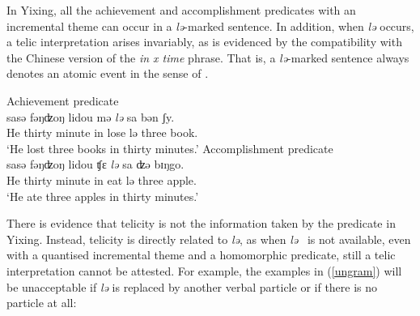 \documentclass[output=paper]{langsci/langscibook}
\begin{document}
In Yixing, all the achievement and accomplishment predicates with an
incremental theme can occur in a \emph{lə}-marked sentence. In addition, when
\emph{lə} occurs, a telic interpretation arises invariably, as is evidenced by
the compatibility with the Chinese version of the \emph{in x time} phrase. That
is, a \emph{lə}-marked sentence always denotes an atomic event in the sense of
\textcite{Rothstein2004}.

\begin{exe}
\ex Achievement predicate\label{achievement predicate}\\
    {sasə} {fəŋʣoŋ} lidou {mə} \emph{lə} sa bən ʃy. \\
    He thirty minute in lose {lə} three \Clf{} book. \\
    \glt \enquote*{He lost three books in thirty minutes.}
\ex Accomplishment predicate\label{accomplishment predicate}\\
    {sasə} {fəŋʣoŋ} lidou {ʧε} \emph{lə} sa {ʣə} bɪŋgo. \\
    He thirty minute in eat {lə} three \Clf{} apple. \\
    \glt \enquote*{He ate three apples in thirty minutes.}
\end{exe}

There is evidence that telicity is not the information taken by the predicate
in Yixing. Instead, telicity is directly related to \emph{lə}, as when
\emph{lə} \ is not available, even with a quantised incremental theme and a
homomorphic predicate, still a telic interpretation cannot be attested. For
example, the examples in (\ref{ungram}) will be unacceptable if
\emph{lə} is replaced by another verbal particle or if there is no particle at
all:

\begin{exe}
    \ex\label{ungram} 
    \begin{xlist}
    \end{xlist}
\end{exe}
\end{document}
